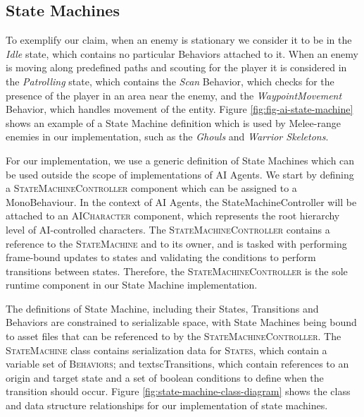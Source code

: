 \subsection{State Machines}

To exemplify our claim, when an enemy is stationary we consider it to be in the \emph{Idle} state, which contains no particular Behaviors attached to it. When an enemy is moving along predefined paths and scouting for the player it is considered in the \emph{Patrolling} state, which contains the \emph{Scan} Behavior, which checks for the presence of the player in an area near the enemy, and the \emph{WaypointMovement} Behavior, which handles movement of the entity. Figure \ref{fig:fig-ai-state-machine} shows an example of a State Machine definition which is used by Melee-range enemies in our implementation, such as the \emph{Ghouls} and \emph{Warrior Skeletons}.



For our implementation, we use a generic definition of State Machines which can be used outside the scope of implementations of AI Agents. We start by defining a \textsc{StateMachineController} component which can be assigned to a MonoBehaviour. In the context of AI Agents, the StateMachineController will be attached to an \textsc{AICharacter} component, which represents the root hierarchy level of AI-controlled characters. The \textsc{StateMachineController} contains a reference to the \textsc{StateMachine} and to its owner, and is tasked with performing frame-bound updates to states and validating the conditions to perform transitions between states. Therefore, the \textsc{StateMachineController} is the sole runtime component in our State Machine implementation.

The definitions of State Machine, including their States, Transitions and Behaviors are constrained to serializable space, with State Machines being bound to asset files that can be referenced to by the \textsc{StateMachineController}. The \textsc{StateMachine} class contains serialization data for \textsc{States}, which contain a variable set of \textsc{Behaviors}; and textsc{Transitions}, which contain references to an origin and target state and a set of boolean conditions to define when the transition should occur. Figure \ref{fig:state-machine-class-diagram} shows the class and data structure relationships for our implementation of state machines.

